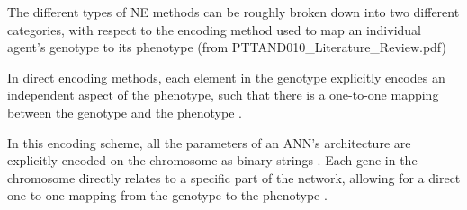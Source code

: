 



The different types of NE methods can be roughly broken down into two different categories, with respect to the encoding method used to map an individual agent's genotype to its phenotype (from PTTAND010_Literature_Review.pdf)




In direct encoding methods, each element in the genotype explicitly encodes an independent aspect of the phenotype, such that there is a one-to-one mapping between the genotype and the phenotype \cite{clune2011performance, stanley2009hypercube}.

In this encoding scheme, all the parameters of an ANN's architecture are explicitly encoded on the chromosome as binary strings \cite{Gomez2003}. Each gene in the chromosome directly relates to a specific part of the network, allowing for a direct one-to-one mapping from the genotype to the phenotype \cite{StanleyMiikkulainen2002}.

